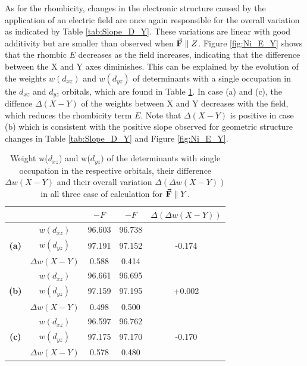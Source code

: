 \documentclass[12pt]{report}
\numberwithin{equation}{section}
\begin{document}
As for the rhombicity, changes in the electronic structure caused by the application of an electric field are once again responsible for the overall variation as indicated by Table \ref{tab:Slope_D_Y}.
These variations are linear with good additivity but are smaller than observed when $\vec{\vb{F}}\parallel Z$. 
Figure \ref{fig:Ni_E_Y} shows that the rhombic $E$ decreases as the field increases, indicating that the difference between the X and Y axes diminishes.
This can be explained by the evolution of the weights $w(d_{xz})$ and $w(d_{yz})$ of determinants with a single occupation in the $d_{xz}$ and $d_{yz}$ orbitals, which are found in Table \ref{tab:PoidsY}.
In case (a) and (c), the diffence $\Delta (X-Y)$ of the weights between X and Y decreases with the field, which reduces the rhombicity term $E$.
Note that $\Delta (X-Y)$ is positive in case (b) which is consistent with the positive slope observed for geometric structure changes in Table \ref{tab:Slope_D_Y} and Figure \ref{fig:Ni_E_Y}.


\begin{table}[h]
    \centering
    \begin{tabular}{c | c | c c | c }
        & &  $-F$ & $-F$ & $\Delta (\Delta w(X-Y))$\\
        \hline
        \multirow{3}{*}{\textbf{(a)}}
        &$w(d_{xz})$ &  96.603 & 96.738 & \\
        &$w(d_{yz})$ &  97.191 & 97.152 & -0.174\\
        &$\Delta w(X-Y)$ & 0.588 & 0.414& \\
        \hline
        \multirow{3}{*}{\textbf{(b)}}
        &$w(d_{xz})$ &  96.661 & 96.695 & \\
        &$w(d_{yz})$ &  97.159 & 97.195 & +0.002\\
        &$\Delta w(X-Y)$ & 0.498 & 0.500& \\
        \hline
        \multirow{3}{*}{\textbf{(c)}}
        &$w(d_{xz})$ &  96.597 & 96.762 & \\
        &$w(d_{yz})$ &  97.175 & 97.170 & -0.170\\
        &$\Delta w(X-Y)$ & 0.578 & 0.480& \\
        \hline
    \end{tabular}
    \caption{Weight w($d_{xz}$) and w($d_{yz})$ of the determinants with single occupation in the respective orbitals, their difference $\Delta w(X-Y)$ and their overall variation $\Delta (\Delta w(X-Y))$ in all three case of calculation for $\vec{\vb{F}}\parallel Y$.}
    \label{tab:PoidsY}
\end{table}
\end{document}
